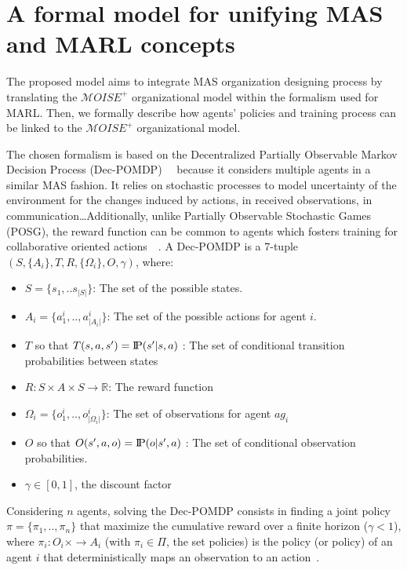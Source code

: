 \documentclass[runningheads]{llncs}
\newcommand{\probP}{\text{I\kern-0.15em P}}
\begin{document}
\section{A formal model for unifying MAS and MARL concepts}

The proposed model aims to integrate MAS organization designing process by translating the $\mathcal{M}OISE^{+}$ organizational model within the formalism used for MARL. Then, we formally describe how agents' policies and training process can be linked to the $\mathcal{M}OISE^{+}$ organizational model.

The chosen formalism is based on the Decentralized Partially Observable Markov Decision Process (Dec-POMDP)~~\cite{Oliehoek2016} because it considers multiple agents in a similar MAS fashion. It relies on stochastic processes to model uncertainty of the environment for the changes induced by actions, in received observations, in communication\dots Additionally, unlike Partially Observable Stochastic Games (POSG), the reward function can be common to agents which fosters training for collaborative oriented actions~~\cite{Beynier2013}.
A Dec-POMDP is a 7-tuple $(S,\{A_i\},T,R,\{\Omega_i\},O,\gamma)$, where:
\begin{itemize}
    \item $S = \{s_1, ..s_{|S|}\}$: The set of the possible states.
    \item $A_{i} = \{a_{1}^{i},..,a_{|A_{i}|}^{i}\}$: The set of the possible actions for agent $i$.
    \item $T$ so that $T(s,a,s') = \probP{(s'|s,a)}$ : The set of conditional transition probabilities between states
    \item $R: S \times A \times S \rightarrow \mathbb{R}$: The reward function
    \item $\Omega_{i} = \{o_{1}^{i},..,o_{|\Omega_{i}|}^{i}\}$: The set of observations for agent $ag_i$
    \item $O$ so that $O(s',a,o) = \probP{(o|s',a)}$ : The set of conditional observation probabilities.
    \item $\gamma \in [0,1]$, the discount factor
\end{itemize}
Considering $n$ agents, solving the Dec-POMDP consists in finding a joint policy $\pi = \{\pi_1,..,\pi_n\}$ that maximize the cumulative reward over a finite horizon ($\gamma < 1$), where $\pi_i: O_i \times \rightarrow A_i$ (with $\pi_i \in \Pi$, the set policies) is the policy (or policy) of an agent $i$ that deterministically maps an observation to an action~\cite{Beynier2013}.
\end{document}
